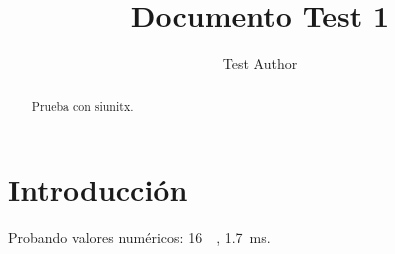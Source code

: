 \documentclass[conference,a4paper]{IEEEtran}
\begin{document}
\title{Documento Test 1}
\author{Test Author}
\maketitle

\begin{abstract}
Prueba con siunitx.
\end{abstract}

\section{Introducción}
Probando valores numéricos: \SI{16}{\giga\byte}, \SI{1.7}{\milli\second}.
\end{document}
